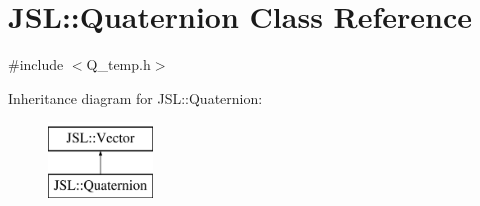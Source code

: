 \hypertarget{classJSL_1_1Quaternion}{}\section{J\+SL\+:\+:Quaternion Class Reference}
\label{classJSL_1_1Quaternion}


{\ttfamily \#include $<$Q\+\_\+temp.\+h$>$}

Inheritance diagram for J\+SL\+:\+:Quaternion\+:\begin{figure}[H]
\begin{center}
\leavevmode
\includegraphics[height=2.000000cm]{classJSL_1_1Quaternion}
\end{center}
\end{figure}
